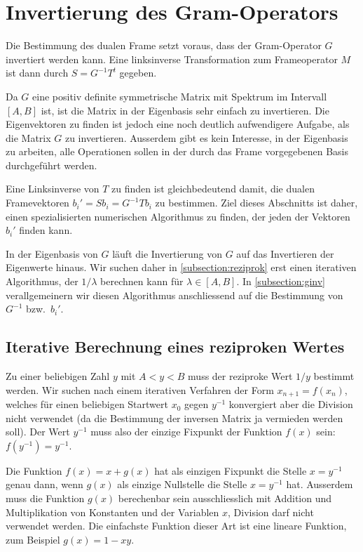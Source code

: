 %
%
%
\section{Invertierung des Gram-Operators\label{section:ginv}}
Die Bestimmung des dualen Frame setzt voraus, dass der Gram-Operator
$G$ invertiert werden kann.
Eine linksinverse Transformation zum Frameoperator $M$ ist dann durch
$S=G^{-1}T^t$ gegeben.

Da $G$ eine positiv definite symmetrische Matrix mit Spektrum im
Intervall $[A,B]$ ist, ist die Matrix in der Eigenbasis sehr einfach
zu invertieren.
Die Eigenvektoren zu finden ist jedoch eine noch deutlich aufwendigere
Aufgabe, als die Matrix $G$ zu invertieren.
Ausserdem gibt es kein Interesse, in der Eigenbasis zu arbeiten, alle
Operationen sollen in der durch das Frame vorgegebenen Basis durchgeführt
werden.

Eine Linksinverse von $T$ zu finden ist gleichbedeutend damit,
die dualen Framevektoren $b_i' = Sb_i = G^{-1}Tb_i$ zu bestimmen.
Ziel dieses Abschnitts ist daher, einen spezialisierten numerischen
Algorithmus zu finden, der jeden der Vektoren $b_i'$ finden kann.

In der Eigenbasis von $G$ läuft die Invertierung von $G$ auf
das Invertieren der Eigenwerte hinaus.
Wir suchen daher in \ref{subsection:reziprok} erst einen iterativen
Algorithmus, der $1/\lambda$ berechnen kann für $\lambda\in[A,B]$.
In \ref{subsection:ginv} verallgemeinern wir diesen Algorithmus
anschliessend auf die Bestimmung von $G^{-1}$ bzw.~$b_i'$.

\subsection{Iterative Berechnung eines reziproken Wertes
\label{subsection:reziprok}}
Zu einer beliebigen Zahl $y$ mit $A < y < B$ muss der reziproke Wert $1/y$
bestimmt werden.
Wir suchen nach einem iterativen Verfahren der Form $x_{n+1}=f(x_n)$,
welches für einen beliebigen Startwert $x_0$ gegen $y^{-1}$ konvergiert
aber die Division nicht verwendet (da die Bestimmung der inversen
Matrix ja vermieden werden soll).
Der Wert $y^{-1}$ muss also der einzige Fixpunkt der Funktion $f(x)$ sein:
$f(y^{-1})=y^{-1}$.

Die Funktion $f(x) = x + g(x)$ hat als einzigen Fixpunkt die Stelle $x=y^{-1}$
genau dann, wenn $g(x)$ als einzige Nullstelle die Stelle $x=y^{-1}$ hat.
Ausserdem muss die Funktion $g(x)$ berechenbar sein ausschliesslich mit
Addition und Multiplikation von Konstanten und der Variablen $x$, Division
darf nicht verwendet werden.
Die einfachste Funktion dieser Art ist eine lineare Funktion, zum 
Beispiel $g(x) = 1- xy$.

